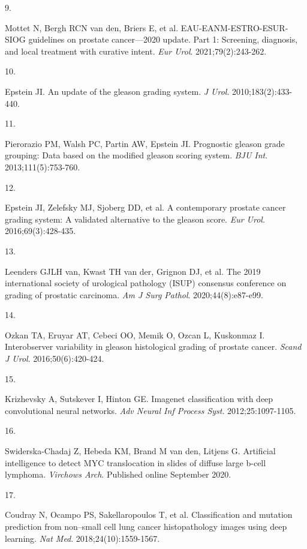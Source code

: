\documentclass[
  12pt,
  a5,margin=2cmpaper,
]{article}
\newlength{\cslhangindent}
\newlength{\csllabelwidth}
\newlength{\cslentryspacingunit} %
\newenvironment{CSLReferences}[2] %
 {%
  \setlength{\parindent}{0pt}
  \ifodd #1
  \let\oldpar\par
  \def\par{\hangindent=\cslhangindent\oldpar}
  \fi
  \setlength{\parskip}{#2\cslentryspacingunit}
 }%
 {}
\newcommand{\CSLLeftMargin}[1]{\parbox[t]{\csllabelwidth}{#1}}
\newcommand{\CSLRightInline}[1]{\parbox[t]{\linewidth - \csllabelwidth}{#1}\break}
\begin{document}
\begin{CSLReferences}{0}{0}
\leavevmode{}%
\CSLLeftMargin{9. }%
\CSLRightInline{Mottet N, Bergh RCN van den, Briers E, et al.
{EAU-EANM-ESTRO-ESUR-SIOG} guidelines on prostate cancer---2020 update.
Part 1: Screening, diagnosis, and local treatment with curative intent.
\emph{Eur Urol}. 2021;79(2):243-262.}

\leavevmode{}%
\CSLLeftMargin{10. }%
\CSLRightInline{Epstein JI. An update of the gleason grading system.
\emph{J Urol}. 2010;183(2):433-440.}

\leavevmode{}%
\CSLLeftMargin{11. }%
\CSLRightInline{Pierorazio PM, Walsh PC, Partin AW, Epstein JI.
Prognostic gleason grade grouping: Data based on the modified gleason
scoring system. \emph{BJU Int}. 2013;111(5):753-760.}

\leavevmode{}%
\CSLLeftMargin{12. }%
\CSLRightInline{Epstein JI, Zelefsky MJ, Sjoberg DD, et al. A
contemporary prostate cancer grading system: A validated alternative to
the gleason score. \emph{Eur Urol}. 2016;69(3):428-435.}

\leavevmode{}%
\CSLLeftMargin{13. }%
\CSLRightInline{Leenders GJLH van, Kwast TH van der, Grignon DJ, et al.
The 2019 international society of urological pathology ({ISUP})
consensus conference on grading of prostatic carcinoma. \emph{Am J Surg
Pathol}. 2020;44(8):e87-e99.}

\leavevmode{}%
\CSLLeftMargin{14. }%
\CSLRightInline{Ozkan TA, Eruyar AT, Cebeci OO, Memik O, Ozcan L,
Kuskonmaz I. Interobserver variability in gleason histological grading
of prostate cancer. \emph{Scand J Urol}. 2016;50(6):420-424.}

\leavevmode{}%
\CSLLeftMargin{15. }%
\CSLRightInline{Krizhevsky A, Sutskever I, Hinton GE. Imagenet
classification with deep convolutional neural networks. \emph{Adv Neural
Inf Process Syst}. 2012;25:1097-1105.}

\leavevmode{}%
\CSLLeftMargin{16. }%
\CSLRightInline{Swiderska-Chadaj Z, Hebeda KM, Brand M van den, Litjens
G. Artificial intelligence to detect {MYC} translocation in slides of
diffuse large b-cell lymphoma. \emph{Virchows Arch}. Published online
September 2020.}

\leavevmode{}%
\CSLLeftMargin{17. }%
\CSLRightInline{Coudray N, Ocampo PS, Sakellaropoulos T, et al.
Classification and mutation prediction from non--small cell lung cancer
histopathology images using deep learning. \emph{Nat Med}.
2018;24(10):1559-1567.}


\end{CSLReferences}
\end{document}

